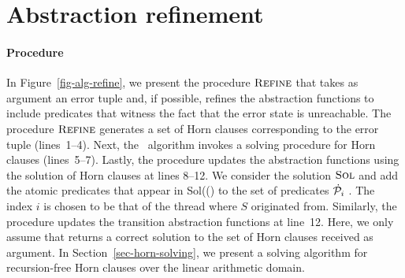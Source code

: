 \section{Abstraction refinement}
\label{sec-refinement}






\paragraph{Procedure \algRefine}
In Figure~\ref{fig-alg-refine}, we present the procedure $\textsc{Refine}$
that takes as argument an error tuple and, if possible,
refines the abstraction functions to include predicates that witness
the fact that the error state is unreachable.
The procedure $\textsc{Refine}$ generates a set of Horn clauses
corresponding to the error tuple (lines~1--4).
Next, the \algRefine~algorithm invokes a solving procedure for Horn
clauses (lines~5--7).
Lastly, the procedure \algRefine updates the abstraction functions
using the solution of Horn clauses at lines 8--12.
We consider the solution $\textsc{Sol}$ and add the atomic predicates
that appear in Sol((\Vars) to the set of predicates
$\dot{\mathcal{P}}_i\ $. 
The index $i$ is chosen to be that of the thread where $S$ originated
from.
Similarly, the procedure updates the transition abstraction functions
at line~12.
Here, we only assume that \algSolveHornClauses returns a correct
solution to the set of Horn clauses received as argument.
In Section~\ref{sec-horn-solving}, we present a solving algorithm for
recursion-free Horn clauses over the linear arithmetic domain.

